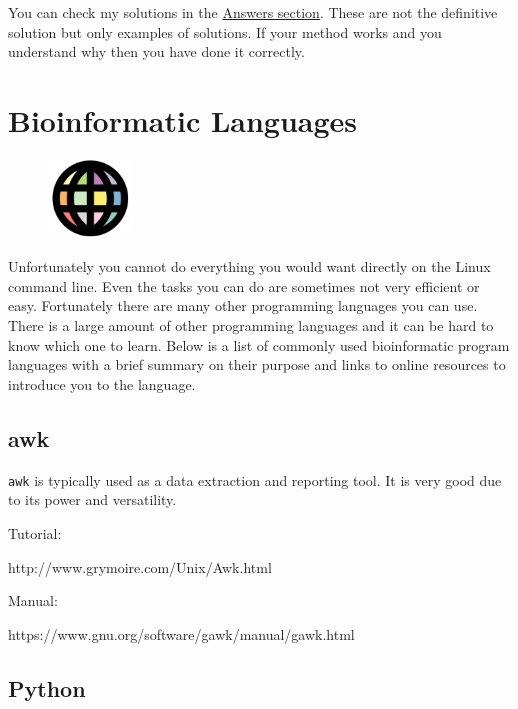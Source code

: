 \documentclass[
  letterpaper,
  DIV=11,
  numbers=noendperiod]{scrreprt}
\begin{document}
You can check my solutions in the
\protect\hyperlink{exerciseadv_answers}{Answers section}. These are not
the definitive solution but only examples of solutions. If your method
works and you understand why then you have done it correctly.

\hypertarget{bfxlanguages}{%
\chapter{Bioinformatic Languages}\label{bfxlanguages}}

\begin{figure}

{\centering \includegraphics[width=0.2\textwidth,height=\textheight]{figures/languages.png}

}

\end{figure}

Unfortunately you cannot do everything you would want directly on the
Linux command line. Even the tasks you can do are sometimes not very
efficient or easy. Fortunately there are many other programming
languages you can use. There is a large amount of other programming
languages and it can be hard to know which one to learn. Below is a list
of commonly used bioinformatic program languages with a brief summary on
their purpose and links to online resources to introduce you to the
language.

\hypertarget{awk}{%
\section{awk}\label{awk}}

\texttt{awk} is typically used as a data extraction and reporting tool.
It is very good due to its power and versatility.

Tutorial:

http://www.grymoire.com/Unix/Awk.html

Manual:

https://www.gnu.org/software/gawk/manual/gawk.html

\hypertarget{python}{%
\section{Python}\label{python}}
\end{document}
